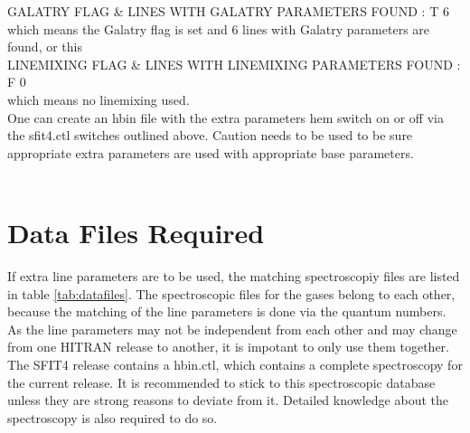 \documentclass[12pt, letterpaper]{article}
\begin{document}
\noindent GALATRY FLAG \& LINES WITH GALATRY PARAMETERS FOUND       :  T      6 \\

\noindent which means the Galatry flag is set and 6 lines with Galatry parameters are found, or this \\

\noindent LINEMIXING FLAG \& LINES WITH LINEMIXING PARAMETERS FOUND :  F      0 \\

\noindent which means no linemixing used.\\

\noindent One can create an hbin file with the extra parameters hem switch on or off via the sfit4.ctl switches outlined above.  Caution needs to be used to be sure appropriate extra parameters are used with appropriate base parameters.  \\ \\



\section{Data Files Required} 
\label{sec:datafiles}


If extra line parameters are to be used, the matching spectroscopiy
files are listed in table \ref{tab:datafiles}. The spectroscopic files
for the gases belong to each other, because the matching of the line
parameters is done via the quantum numbers. As the line parameters may
not be independent from each other and may change from one HITRAN
release to another, it is impotant to only use them together. The
SFIT4 release contains a hbin.ctl, which contains a complete
spectroscopy for the current release. It is recommended to stick to
this spectroscopic database unless they are strong reasons to deviate
from it. Detailed knowledge about the spectroscopy is also required to do so.
\end{document}
